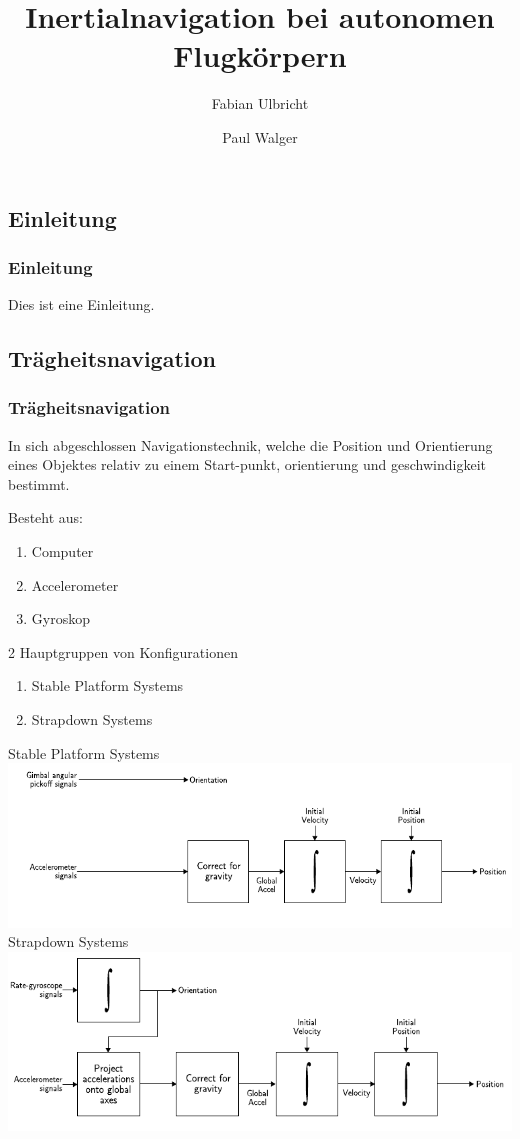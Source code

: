 \documentclass[10pt,a4paper,oneside]{beamer}
\title{Inertialnavigation bei autonomen Flugkörpern}
\author{
	Fabian Ulbricht \and
	Paul Walger 
}
\begin{document}
\frame{
	\titlepage
}


\begin{frame}
  \section{Einleitung}
  \frametitle{Einleitung}
  
  Dies ist eine Einleitung.
\end{frame}


\begin{frame}
	\section{Trägheitsnavigation}
	\frametitle{Trägheitsnavigation}
	In sich abgeschlossen Navigationstechnik, 
	welche die Position und Orientierung eines Objektes relativ zu einem Start-punkt, orientierung und geschwindigkeit bestimmt.
	
	Besteht aus:
	\begin{enumerate}
		\item Computer
		\item Accelerometer
		\item Gyroskop
	\end{enumerate}
	
	2 Hauptgruppen von Konfigurationen \cite{Wood07}
	\begin{enumerate}
		\item Stable Platform Systems
		\item Strapdown Systems
	\end{enumerate}
\end{frame}
\begin{frame}
	Stable Platform Systems
	\resizebox{\textwidth}{0.4\textheight} {
	\includegraphics[scale=1]{images/stable_platform.png} 
	}
	\bigskip
	Strapdown Systems
	\resizebox{\textwidth}{0.4\textheight} {
		\includegraphics[scale=1]{images/strapdown.png} 
	}

\end{frame}
\end{document}
